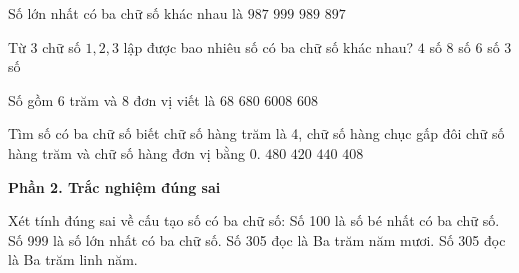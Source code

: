 \begin{ex} %
Số lớn nhất có ba chữ số khác nhau là
\choice
{\True $987$}
{$999$}
{$989$}
{$897$}
\end{ex}

\begin{ex} %
Từ 3 chữ số $1, 2, 3$ lập được bao nhiêu số có ba chữ số khác nhau?
\choice
{$4$ số}
{$8$ số}
{\True $6$ số}
{$3$ số}
\end{ex}

\begin{ex} %
Số gồm 6 trăm và 8 đơn vị viết là
\choice
{$68$}
{$680$}
{$6008$}
{\True $608$}
\end{ex}

\begin{ex} %
Tìm số có ba chữ số biết chữ số hàng trăm là 4, chữ số hàng chục gấp đôi chữ số hàng trăm và chữ số hàng đơn vị bằng 0.
\choice
{\True $480$}
{$420$}
{$440$}
{$408$}
\end{ex}

\textbf{Phần 2. Trắc nghiệm đúng sai}

\begin{ex} %
Xét tính đúng sai về cấu tạo số có ba chữ số:
\choiceTF
{\True Số 100 là số bé nhất có ba chữ số.}
{\True Số 999 là số lớn nhất có ba chữ số.}
{Số 305 đọc là Ba trăm năm mươi.}
{\True Số 305 đọc là Ba trăm linh năm.}
\end{ex}

